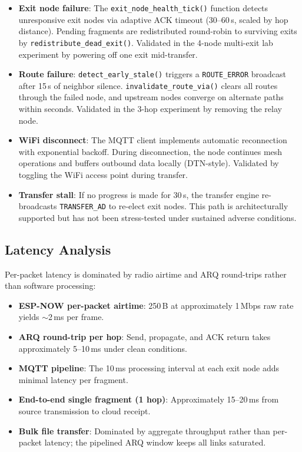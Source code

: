 \documentclass[conference]{IEEEtran}
\begin{document}
\begin{itemize}
  \item \textbf{Exit node failure}: The \texttt{exit\_node\_health\_tick()} function detects unresponsive exit nodes via adaptive ACK timeout (30--60\,s, scaled by hop distance). Pending fragments are redistributed round-robin to surviving exits by \texttt{redistribute\_dead\_exit()}. Validated in the 4-node multi-exit lab experiment by powering off one exit mid-transfer.
  \item \textbf{Route failure}: \texttt{detect\_early\_stale()} triggers a \texttt{ROUTE\_ERROR} broadcast after 15\,s of neighbor silence. \texttt{invalidate\_route\_via()} clears all routes through the failed node, and upstream nodes converge on alternate paths within seconds. Validated in the 3-hop experiment by removing the relay node.
  \item \textbf{WiFi disconnect}: The MQTT client implements automatic reconnection with exponential backoff. During disconnection, the node continues mesh operations and buffers outbound data locally (DTN-style). Validated by toggling the WiFi access point during transfer.
  \item \textbf{Transfer stall}: If no progress is made for 30\,s, the transfer engine re-broadcasts \texttt{TRANSFER\_AD} to re-elect exit nodes. This path is architecturally supported but has not been stress-tested under sustained adverse conditions.
\end{itemize}

\subsection{Latency Analysis}

Per-packet latency is dominated by radio airtime and ARQ round-trips rather than software processing:

\begin{itemize}
  \item \textbf{ESP-NOW per-packet airtime}: 250\,B at approximately 1\,Mbps raw rate~\cite{espressif2024espnow} yields $\sim$2\,ms per frame.
  \item \textbf{ARQ round-trip per hop}: Send, propagate, and ACK return takes approximately 5--10\,ms under clean conditions.
  \item \textbf{MQTT pipeline}: The 10\,ms processing interval at each exit node adds minimal latency per fragment.
  \item \textbf{End-to-end single fragment (1 hop)}: Approximately 15--20\,ms from source transmission to cloud receipt.
  \item \textbf{Bulk file transfer}: Dominated by aggregate throughput rather than per-packet latency; the pipelined ARQ window keeps all links saturated.
\end{itemize}
\end{document}
